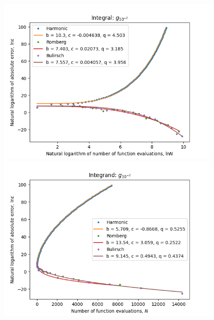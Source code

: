 \begin{figure}[H]
\centering
\begin{minipage}{0.45\textwidth}
\centering
\includegraphics[scale=0.45]{romberg_plots/g_hundredth_hp_log_log_pow_fit_trend.png}
\end{minipage}
\begin{minipage}{0.45\textwidth}
\centering
\includegraphics[scale=0.45]{romberg_plots/g_hundredth_hp_trend.png}
\end{minipage}
\end{figure}

